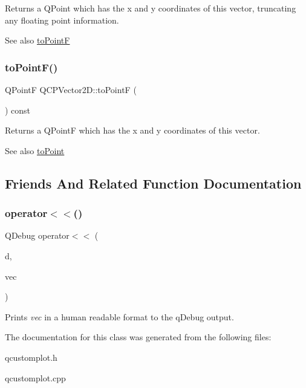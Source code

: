 Returns a Q\+Point which has the x and y coordinates of this vector, truncating any floating point information.

\begin{DoxySeeAlso}{See also}
\hyperlink{class_q_c_p_vector2_d_acd7af3f4a62833ada58be3f3021dbbac}{to\+PointF} 
\end{DoxySeeAlso}
\mbox{\label{class_q_c_p_vector2_d_acd7af3f4a62833ada58be3f3021dbbac}} 
\subsubsection{\texorpdfstring{to\+Point\+F()}{toPointF()}}
{\footnotesize\ttfamily Q\+PointF Q\+C\+P\+Vector2\+D\+::to\+PointF (\begin{DoxyParamCaption}{ }\end{DoxyParamCaption}) const\hspace{0.3cm}{\ttfamily [inline]}}

Returns a Q\+PointF which has the x and y coordinates of this vector.

\begin{DoxySeeAlso}{See also}
\hyperlink{class_q_c_p_vector2_d_add3edf75de9b7bf1abc693b973b2e906}{to\+Point} 
\end{DoxySeeAlso}


\subsection{Friends And Related Function Documentation}
\mbox{\label{class_q_c_p_vector2_d_a6c757af9671d925af4a36c2f58fb7234}} 
\subsubsection{\texorpdfstring{operator$<$$<$()}{operator<<()}}
{\footnotesize\ttfamily Q\+Debug operator$<$$<$ (\begin{DoxyParamCaption}\item[{Q\+Debug}]{d,  }\item[{const \hyperlink{class_q_c_p_vector2_d}{Q\+C\+P\+Vector2D} \&}]{vec }\end{DoxyParamCaption})\hspace{0.3cm}{\ttfamily [related]}}

Prints {\itshape vec} in a human readable format to the q\+Debug output. 

The documentation for this class was generated from the following files\+:\begin{DoxyCompactItemize}
\item 
qcustomplot.\+h\item 
qcustomplot.\+cpp\end{DoxyCompactItemize}
